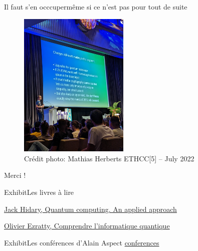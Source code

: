 \documentclass{beamer}
\begin{document}
\begin{frame}{Il faut s'en occcuper}{m\^eme si ce n'est pas pour tout de suite}
  \begin{center}
    \begin{figure}
      \includegraphics[height=7cm]{eth.jpg}
      \caption*{Cr\'edit photo: Mathias Herberts ETHCC[5] -- July 2022}
    \end{figure}
  \end{center}
\end{frame}

\begin{frame}
        Merci !
\end{frame}

\begin{frame}{Exhibit}{Les livres \`a lire}
  \begin{description}
  \item \href{https://dokumen.pub/quantum-computing-an-applied-approach-9783030239213-9783030239220.html}{Jack Hidary, Quantum computing. An applied approach}
  \item \href{https://www.oezratty.net/wordpress/wp-content/themes/Ezratty5/forcedownload.php?file=/Files/Publications/Comprendre\%20Informatique\%20Quantique\%20Olivier\%20Ezratty.pdf}{Olivier Ezratty, Comprendre l’informatique quantique}
  \end{description}
\end{frame}

\begin{frame}{Exhibit}{Les conf\'erences d'Alain Aspect}
  \href{https://www.youtube.com/watch?v=6_hfvgOcSTQ&ab_channel=Festivald\%27AstronomiedeFleurance}{conferences}
\end{frame}
\end{document}
